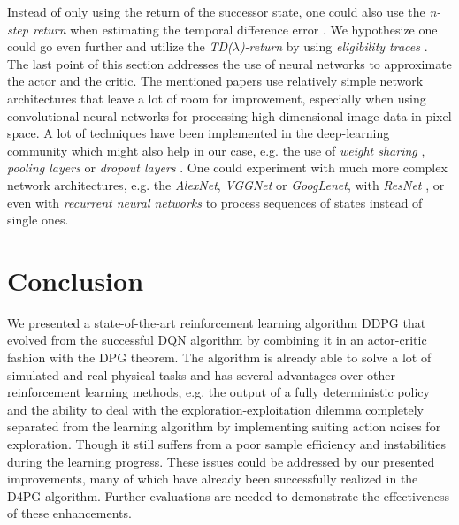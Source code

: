 Instead of only using the return of the successor state, one could also use the \textit{n-step return} when estimating the temporal difference error \citep{barth2018distributed}. We hypothesize one could go even further and utilize the \textit{TD($\lambda$)-return} by using \textit{eligibility traces} \citep{tesauro1995temporal}.\\
The last point of this section addresses the use of neural networks to approximate the actor and the critic. The mentioned papers use relatively simple network architectures that leave a lot of room for improvement, especially when using convolutional neural networks for processing high-dimensional image data in pixel space. A lot of techniques have been implemented in the deep-learning community which might also help in our case, e.g. the use of \textit{weight sharing} \citep{nowlan1992simplifying}, \textit{pooling layers} \citep{zeiler2013stochastic} or \textit{dropout layers} \citep{srivastava2014dropout}. One could experiment with much more complex network architectures, e.g. the \textit{AlexNet}, \textit{VGGNet} or \textit{GoogLenet}, with \textit{ResNet} \citep{he2016deep}, or even with \textit{recurrent neural networks} \citep{haykin1994neural} to process sequences of states instead of single ones. 


\section{Conclusion}
\label{sec:conclusion}
We presented a state-of-the-art reinforcement learning algorithm DDPG that evolved from the successful DQN algorithm by combining it in an actor-critic fashion with the DPG theorem. The algorithm is already able to solve a lot of simulated and real physical tasks and has several advantages over other reinforcement learning methods, e.g. the output of a fully deterministic policy and the ability to deal with the exploration-exploitation dilemma completely separated from the learning algorithm by implementing suiting action noises for exploration. Though it still suffers from a poor sample efficiency and instabilities during the learning progress. These issues could be addressed by our presented improvements, many of which have already been successfully realized in the D4PG algorithm. Further evaluations are needed to demonstrate the effectiveness of these enhancements.

\newpage




